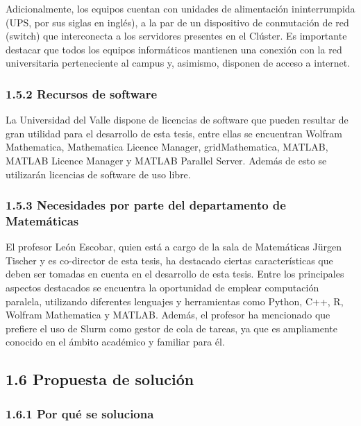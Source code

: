 \begin{spacing}{1.5}
    Adicionalmente, los equipos cuentan con unidades de alimentación ininterrumpida (UPS, por sus siglas en inglés), a la par de un dispositivo de conmutación de red (switch) que interconecta a los servidores presentes en el Clúster. Es importante destacar que todos los equipos informáticos mantienen una conexión con la red universitaria perteneciente al campus y, asimismo, disponen de acceso a internet.

    \subsubsection{1.5.2 Recursos de software}

    La Universidad del Valle dispone de licencias de software que pueden resultar de gran utilidad para el desarrollo de esta tesis, entre ellas se encuentran Wolfram Mathematica, Mathematica Licence Manager, gridMathematica, MATLAB, MATLAB Licence Manager y MATLAB Parallel Server. Además de esto se utilizarán licencias de software de uso libre.

    \subsubsection{1.5.3 Necesidades por parte del departamento de Matemáticas}

    El profesor León Escobar, quien está a cargo de la sala de Matemáticas Jürgen Tischer y es co-director de esta tesis, ha destacado ciertas características que deben ser tomadas en cuenta en el desarrollo de esta tesis. Entre los principales aspectos destacados se encuentra la oportunidad de emplear computación paralela, utilizando diferentes lenguajes y herramientas como Python, C++, R, Wolfram Mathematica y MATLAB.
    Además, el profesor ha mencionado que prefiere el uso de Slurm como gestor de cola de tareas, ya que es ampliamente conocido en el ámbito académico y familiar para él.

    \subsection{1.6 Propuesta de solución}
    \subsubsection{1.6.1 Por qué se soluciona}


\end{spacing}

